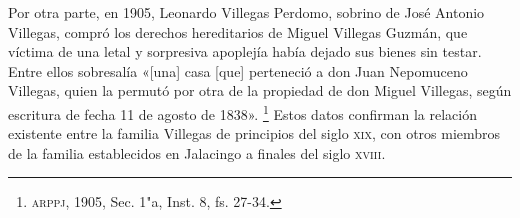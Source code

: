 \documentclass[14pt,twoside,final]{extbook} %
\let\oldfootnote\footnote
\renewcommand\footnote[1]{%
\oldfootnote{\hspace{1mm}#1}}
\begin{document}
Por otra parte, en 1905, Leonardo Villegas Perdomo, sobrino de José Antonio Villegas, compró los derechos hereditarios de Miguel Villegas Guzmán, que víctima de una letal y sorpresiva apoplejía había dejado sus bienes sin testar. Entre ellos sobresalía «[una] casa [que] perteneció a don Juan Nepomuceno Villegas, quien la permutó por otra de la propiedad de don Miguel Villegas, según escritura de fecha 11 de agosto de 1838».\footnote{\textsc{arppj}, 1905, Sec. 1"a, Inst. 8, fs. 27-34.} Estos datos confirman la relación existente entre la familia Villegas de principios del siglo \textsc{xix}, con otros miembros de la familia establecidos en Jalacingo a finales del siglo \textsc{xviii}.
\end{document}
